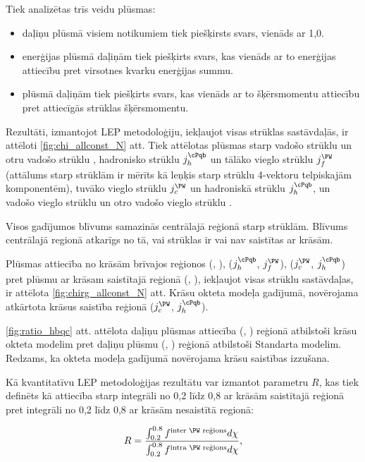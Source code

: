 \label{sec:LEP_methodology}

Tiek analizētas trīs veidu plūsmas:
\begin{itemize}
\item daļiņu plūsmā visiem notikumiem tiek piešķirsts svars, vienāds ar 1,0.
\item enerģijas plūsmā daļiņām tiek piešķirts svars, kas vienāds ar to enerģijas attiecību pret virsotnes kvarku enerģijas summu.
\item \pt plūsmā daļiņām tiek piešķirts svars, kas vienāds ar to šķērsmomentu attiecību pret attiecīgās strūklas šķērsmomentu.
\end{itemize}

Rezultāti, izmantojot LEP metodoloģiju, iekļaujot visas strūklas sastāvdaļās, ir attēloti \ref{fig:chi_allconst_N} att. Tiek attēlotas plūsmas starp vadošo \cPqb strūklu \leadingb un otru vadošo \cPqb strūklu \scndleadingb, hadronisko \cPqb strūklu $j_{h}^{\cPqb}$ un tālāko vieglo strūklu $j_{f}^{\PW}$ (attālums starp strūklām ir mērīts kā leņķis starp strūklu 4-vektoru telpiskajām komponentēm), tuvāko vieglo strūklu $j_{c}^{\PW}$ un hadroniskā \cPqb strūklu $j_{h}^{\cPqb}$, un vadošo vieglo strūklu \leadingjet un otro vadošo vieglo strūklu \scndleadingjet.

Visos gadījumos blīvums samazinās centrālajā reģionā starp strūklām. Blīvums centrālajā regionā atkarīgs no tā, vai strūklas ir vai nav saistītas ar krāsām.

Plūsmas attiecība no krāsām brīvajos reģionos (\leadingb, \scndleadingb), ($j_{h}^{\cPqb}$, $j_{f}^{\PW}$), ($j_{c}^{\PW}$, $j_{h}^{\cPqb}$) pret plūsmu ar krāsam saistītajā reģionā (\leadingjet, \scndleadingjet), iekļaujot visas strūklu sastāvdaļas, ir attēlota \ref{fig:chirg_allconst_N} att. Krāsu okteta \PW modeļa gadījumā, novērojama atkārtota krāsus saistība reģionā ($j_{c}^{\PW}$, $j_{h}^{\cPqb}$).

\ref{fig:ratio_hbqc} att. attēlota daļiņu plūsmas attiecība (\leadingjet, \scndleadingjet) reģionā atbilstoši krāsu okteta \PW modelim pret daļiņu plūsmu (\leadingjet, \scndleadingjet) reģionā atbilstoši Standarta modelim. Redzams, ka \PW okteta modeļa gadījumā novērojama krāsu saistības izzušana.

Kā kvantitatīvu LEP metodoloģijas rezultātu var izmantot parametru $R$, kas tiek definēts kā attiecība starp integrāli no 0,2 līdz 0,8 ar krāsām saistītajā reģionā pret integrāli no 0,2 līdz 0,8 ar krāsām nesaistītā regionā:

\begin{equation}
R=\frac{\int_{0.2}^{0.8}f^{\text{inter \PW reģions}}d\chi}{\int_{0.2}^{0.8}f^{\text{intra \PW reģions}}d\chi},
\end{equation}


